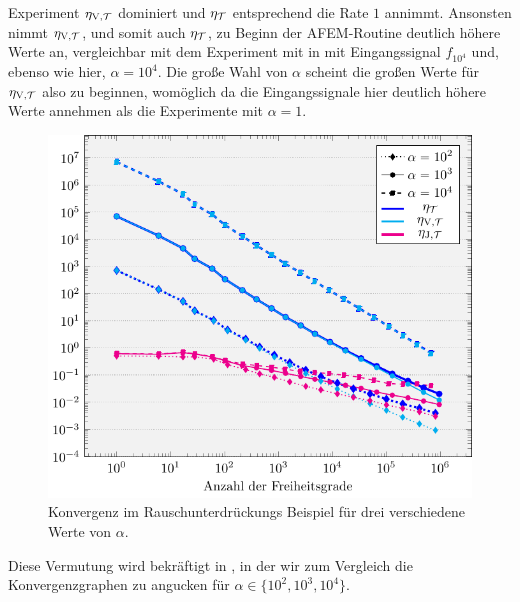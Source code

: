Experiment $\eta_{\textup{V}, \mathcal{T}}$ dominiert und $\eta_{\mathcal{T}}$ entsprechend die Rate $1$ annimmt.
Ansonsten nimmt $\eta_{\textup{V}, \mathcal{T}}$, und somit auch $\eta_{\mathcal{T}}$, zu Beginn der AFEM-Routine
deutlich höhere Werte an, vergleichbar mit dem Experiment mit in
 mit Eingangssignal $f_{10^4}$ und,
ebenso wie hier, $\alpha=10^4$. 
Die große Wahl von $\alpha$ scheint die großen Werte für $\eta_{\textup{V}, \mathcal{T}}$ also zu
beginnen, womöglich da die Eingangssignale hier deutlich höhere Werte annehmen
als die Experimente mit $\alpha=1$.
\begin{figure}[p]
  \centering
  \includegraphics[width=\linewidth]
    {pictures/chapExperiments/secGrayscale/denoise/conv.pdf}
  \caption{Konvergenz im Rauschunterdrückungs Beispiel für drei verschiedene
  Werte von $\alpha$.}
  \label{fig:denoiseConvergence}
\end{figure}
Diese Vermutung wird bekräftigt in , in der wir
zum Vergleich die Konvergenzgraphen zu  angucken für
$\alpha\in\{10^2,10^3,10^4\}$.
